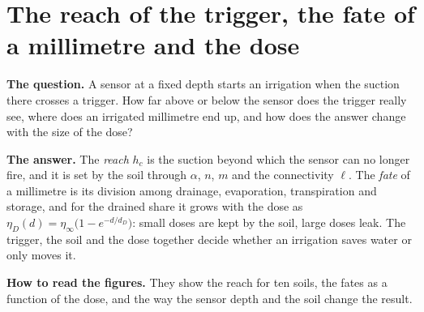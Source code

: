 \section{The reach of the trigger, the fate of a millimetre and the dose}
\textbf{The question.} A sensor at a fixed depth starts an irrigation when the suction there crosses a trigger. How far above or below the sensor does the trigger really see, where does an irrigated millimetre end up, and how does the answer change with the size of the dose?

\par\noindent\textbf{The answer.} The \emph{reach} $h_c$ is the suction beyond which the sensor can no longer fire, and it is set by the soil through $\alpha$, $n$, $m$ and the connectivity $\ell$. The \emph{fate} of a millimetre is its division among drainage, evaporation, transpiration and storage, and for the drained share it grows with the dose as $\eta_D(d)=\eta_\infty\bigl(1-e^{-d/d_D}\bigr)$: small doses are kept by the soil, large doses leak. The trigger, the soil and the dose together decide whether an irrigation saves water or only moves it.

\par\noindent\textbf{How to read the figures.} They show the reach for ten soils, the fates as a function of the dose, and the way the sensor depth and the soil change the result.

